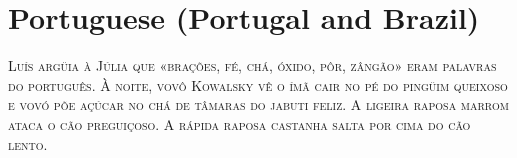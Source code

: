 

\presection\section*{\checkno Portuguese (Portugal and Brazil)}\postsection

\noindent\textsc{Luís argüia à Júlia que «brações, fé, chá, óxido, pôr, zângão» 
eram palavras do português. 
À noite, vovô Kowalsky vê o ímã cair no pé do pingüim queixoso 
e vovó põe açúcar no chá de tâmaras do jabuti feliz. 
A ligeira raposa marrom ataca o cão preguiçoso.
A rápida raposa castanha salta por cima do cão lento.}